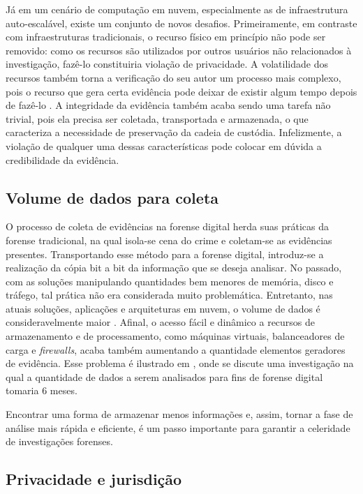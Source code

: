 Já em um cenário de computação em nuvem, especialmente as de infraestrutura auto-escalável, existe um conjunto de novos desafios. 
%
Primeiramente, em contraste com infraestruturas tradicionais, o recurso físico em princípio não pode ser removido: como os recursos são utilizados por outros usuários não relacionados à investigação, fazê-lo constituiria violação de privacidade.
%
A volatilidade dos recursos também torna a verificação do seu autor um processo mais complexo, pois o recurso que gera certa evidência pode deixar de existir algum tempo depois de fazê-lo \cite{SimouCloudChlng:2014}.
%
A integridade da evidência também acaba sendo uma tarefa não trivial, pois ela precisa ser coletada, transportada e armazenada, o que caracteriza a necessidade de preservação da cadeia de custódia.
%
Infelizmente, a violação de qualquer uma dessas características pode colocar em dúvida a credibilidade da evidência.


\subsection{Volume de dados para coleta}
\label{sec:volumedados}

O processo de coleta de evidências na forense digital herda suas práticas da forense tradicional, na qual isola-se cena do crime e coletam-se as evidências presentes. 
%
Transportando esse método para a forense digital, introduz-se a realização da cópia bit a bit da informação que se deseja analisar.
%
No passado, com as soluções manipulando quantidades bem menores de memória, disco e tráfego, tal prática não era considerada muito problemática. 
%
Entretanto, nas atuais soluções, aplicações e arquiteturas em nuvem, o volume de dados é consideravelmente maior \cite{QuickIncreaseVolumeImpact:2014}.
%
Afinal, o acesso fácil e dinâmico a recursos de armazenamento e de processamento, como máquinas virtuais, balanceadores de carga e \textit{firewalls}, acaba também aumentando a quantidade elementos geradores de evidência.
%
Esse problema é ilustrado em \cite{QuickIncreaseVolumeImpact:2014}, onde se discute uma investigação na qual a quantidade de dados a serem analisados para fins de forense digital tomaria 6 meses.


Encontrar uma forma de armazenar menos informações e, assim, tornar a fase de análise mais rápida e eficiente, é um passo importante para garantir a celeridade de investigações forenses.


\subsection{Privacidade e jurisdição}
\label{sec:violacaoprivacidadejuriscdicao}


